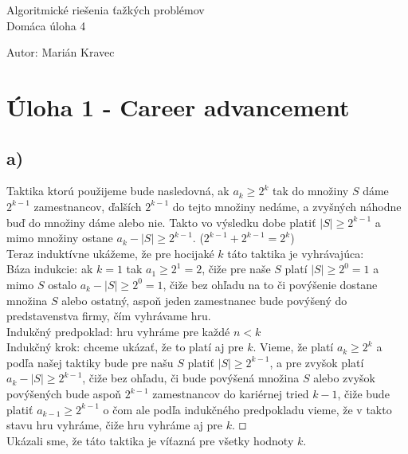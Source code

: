 \documentclass[a4paper]{article}
\begin{document}
 
	
\pagestyle{plain}

\begin{center}
	\sc\large
	Algoritmické riešenia ťažkých problémov\\
	Domáca úloha 4
\end{center}

Autor: Marián Kravec

\section{Úloha 1 - Career advancement}

\subsection*{a)}

Taktika ktorú použijeme bude nasledovná, ak $a_k \geq 2^k$ tak do množiny $S$ dáme $2^{k-1}$ zamestnancov, ďalších $2^{k-1}$ do tejto množiny nedáme, a zvyšných náhodne buď do množiny dáme alebo nie. Takto vo výsledku dobe platiť $|S| \geq 2^{k-1}$ a mimo množiny ostane $a_k - |S| \geq 2^{k-1}$. ($2^{k-1} + 2^{k-1} = 2^k$)
\\

Teraz induktívne ukážeme, že pre hocijaké $k$ táto taktika je vyhrávajúca:
\\

Báza indukcie: ak $k=1$ tak $a_1 \geq 2^1 = 2$, čiže pre naše $S$ platí $|S| \geq 2^0 = 1$ a mimo $S$ ostalo $a_k - |S| \geq 2^0 = 1$, čiže bez ohľadu na to či povýšenie dostane množina $S$ alebo ostatný, aspoň jeden zamestnanec bude povýšený do predstavenstva firmy, čím vyhrávame hru.
\\

Indukčný predpoklad: hru vyhráme pre každé $n<k$
\\

Indukčný krok: chceme ukázať, že to platí aj pre $k$. Vieme, že platí $a_k \geq 2^k$ a podľa našej taktiky bude pre našu $S$ platiť $|S| \geq 2^{k-1}$, a pre zvyšok platí $a_k - |S| \geq 2^{k-1}$, čiže bez ohľadu, či bude povýšená množina $S$ alebo zvyšok povýšených bude aspoň $2^{k-1}$ zamestnancov do kariérnej tried $k-1$, čiže bude platiť $a_{k-1} \geq 2^{k-1}$ o čom ale podľa indukčného predpokladu vieme, že v takto stavu hru vyhráme, čiže hru vyhráme aj pre $k$. $\oblong$
\\

Ukázali sme, že táto taktika je víťazná pre všetky hodnoty $k$.
\end{document}
